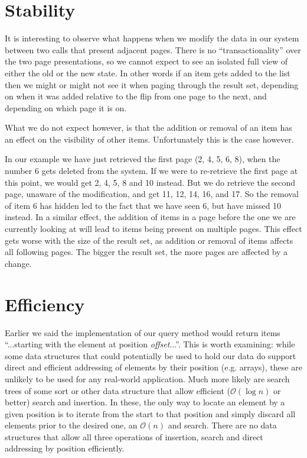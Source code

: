 \documentclass[11pt,a4paper]{article}
\begin{document}
\begin{multicols}{2}
\section*{Stability}
It is interesting to observe what happens when we modify the data in our system
between two calls that present adjacent pages. There is no ``transactionality''
over the two page presentations, so we cannot expect to see an isolated full
view of either the old or the new state. In other words if an item gets added to
the list then we might or might not see it when paging through the result set,
depending on when it was added relative to the flip from one page to the next,
and depending on which page it is on. 

What we do not expect however, is that the addition or removal of an item has an
effect on the visibility of other items. Unfortunately this is the case however. 

In our example we have just retrieved the first page (2, 4, 5, 6, 8), when the
number 6 gets deleted from the system. If we were to re-retrieve the first page
at this point, we would get 2, 4, 5, 8 and 10 instead. But we do retrieve the
second page, unaware of the modification, and get 11, 12, 14, 16, and 17. So the
removal of item 6 has hidden led to the fact that we have seen 6, but have
missed 10 instead. In a similar effect, the addition of items in a page before
the one we are currently looking at will lead to items being present on multiple
pages. This effect gets worse with the size of the result set, as addition or
removal of items affects all following pages. The bigger the result set, the
more pages are affected by a change.

\section*{Efficiency}
Earlier we said the implementation of our query method would return items 
``...starting with the element at position {\em offset}...''. This is worth
examining: while some data structures that could potentially be used to hold our
data do support direct and efficient addressing of elements by their position
(e.g. arrays), these are unlikely to be used for any real-world application.
Much more likely are search trees of some sort or other data structure that 
allow efficient ($\mathcal{O}(\log{}n)$ or better) search and insertion. In 
these, the only way to locate an element by a
given position is to iterate from the start to that position and simply discard
all elements prior to the desired one, an $\mathcal{O}(n)$ and search. There are
no data structures that allow all three operations of insertion, search and
direct addressing by position efficiently. 


\end{multicols}
\end{document}
